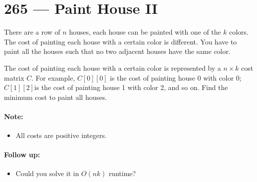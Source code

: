 \section{265 --- Paint House II}
There are a row of $n$ houses, each house can be painted with one of the $k$ colors. The cost of painting each house with a certain color is different. You have to paint all the houses such that no two adjacent houses have the same color.
\par
The cost of painting each house with a certain color is represented by a $n \times k$ cost matrix $C$. For example, $C[0][0]$ is the cost of painting house 0 with color 0; $C[1][2]$is the cost of painting house 1 with color 2, and so on. Find the minimum cost to paint all houses.

\paragraph{Note:}
\begin{itemize}
\item All costs are positive integers.
\end{itemize}

\paragraph{Follow up:}
\begin{itemize}
\item Could you solve it in $O(nk)$ runtime?
\end{itemize}

